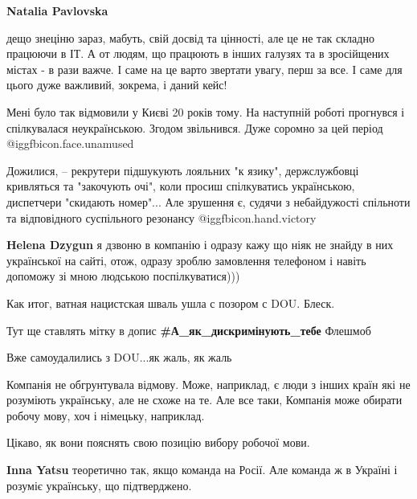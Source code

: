 \begin{itemize}
\begin{itemize} %
\textbf{Natalia Pavlovska} 

дещо знеціню зараз, мабуть, свій досвід та цінності, але це не так складно
працюючи в ІТ. А от людям, що працюють в інших галузях та в зросійщених містах
- в рази важче. І саме на це варто звертати увагу, перш за все. І саме для
цього дуже важливий, зокрема, і даний кейс!

\end{itemize} %


Мені було так відмовили у Києві 20 років тому. На наступній роботі прогнувся і
спілкувалася неукраїнською. Згодом звільнився. Дуже соромно за цей період  @igg{fbicon.face.unamused} 


Дожилися, – рекрутери підшукують лояльних "к язику", держслужбовці кривляться
та "закочують очі", коли просиш спілкуватись українською, диспетчери "скидають
номер"... Але зрушення є, судячи з небайдужості спільноти та відповідного
суспільного резонансу @igg{fbicon.hand.victory}

\begin{itemize} %
\textbf{Helena Dzygun} я дзвоню в компанію і одразу кажу що ніяк не знайду в них української на сайті, отож, одразу зроблю замовлення телефоном і навіть допоможу зі мною людською поспілкуватися)))
\end{itemize} %

Как итог, ватная нацистская шваль ушла с позором с DOU.
Блеск.

Тут ще ставлять мітку в допис \textbf{\#А\_як\_дискримінують\_тебе}
Флешмоб

Вже самоудалились з DOU...як жаль, як жаль


Компанія не обгрунтувала відмову. Може, наприклад, є люди з інших країн які не
розуміють українську, але не схоже на те. Але все таки, Компанія може обирати
робочу мову, хоч і німецьку, наприклад.

Цікаво, як вони пояснять свою позицію вибору робочої мови.

\begin{itemize} %
\textbf{Inna Yatsu} теоретично так, якщо команда на Росії. Але команда ж в Україні і розуміє українську, що підтверджено.


\end{itemize}
\end{itemize}

